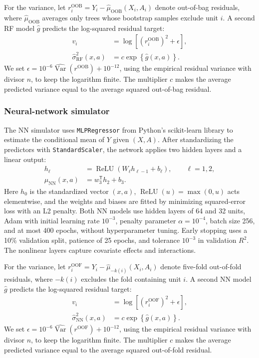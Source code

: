 \begin{landscape}
For the variance, let \(r_i^{\mathrm{OOB}}=Y_i-\widehat\mu_{\mathrm{OOB}}(X_i,A_i)\) denote out-of-bag residuals, where \(\widehat\mu_{\mathrm{OOB}}\) averages only trees whose bootstrap samples exclude unit \(i\). A second RF model \(\widehat g\) predicts the log-squared residual target:
\[
\begin{aligned}
v_i &= \log\!\left[(r_i^{\mathrm{OOB}})^2+\epsilon\right],\\
\widehat\sigma_{\mathrm{RF}}^2(x,a) &= c\exp\!\left\{\widehat g(x,a)\right\}.
\end{aligned}
\]
We set \(\epsilon=10^{-6}\widehat{\operatorname{Var}}(r^{\mathrm{OOB}})+10^{-12}\), using the empirical residual variance with divisor \(n\), to keep the logarithm finite. The multiplier \(c\) makes the average predicted variance equal to the average squared out-of-bag residual.

\subsubsection{Neural-network simulator}

The NN simulator uses \texttt{MLPRegressor} from Python's scikit-learn library to estimate the conditional mean of \(Y\) given \((X,A)\). After standardizing the predictors with \texttt{StandardScaler}, the network applies two hidden layers and a linear output:
\[
\begin{aligned}
h_\ell &= \operatorname{ReLU}(W_\ell h_{\ell-1}+b_\ell),\qquad \ell=1,2,\\
\widehat\mu_{\mathrm{NN}}(x,a) &= w_3^{\mathsf T}h_2+b_3.
\end{aligned}
\]
Here \(h_0\) is the standardized vector \((x,a)\), \(\operatorname{ReLU}(u)=\max(0,u)\) acts elementwise, and the weights and biases are fitted by minimizing squared-error loss with an L2 penalty. Both NN models use hidden layers of 64 and 32 units, Adam with initial learning rate \(10^{-3}\), penalty parameter \(\alpha=10^{-4}\), batch size 256, and at most 400 epochs, without hyperparameter tuning. Early stopping uses a 10\% validation split, patience of 25 epochs, and tolerance \(10^{-3}\) in validation \(R^2\). The nonlinear layers capture covariate effects and interactions.

For the variance, let \(r_i^{\mathrm{OOF}}=Y_i-\widehat\mu_{-k(i)}(X_i,A_i)\) denote five-fold out-of-fold residuals, where \(-k(i)\) excludes the fold containing unit \(i\). A second NN model \(\widehat g\) predicts the log-squared residual target:
\[
\begin{aligned}
v_i &= \log\!\left[(r_i^{\mathrm{OOF}})^2+\epsilon\right],\\
\widehat\sigma_{\mathrm{NN}}^2(x,a) &= c\exp\!\left\{\widehat g(x,a)\right\}.
\end{aligned}
\]
We set \(\epsilon=10^{-6}\widehat{\operatorname{Var}}(r^{\mathrm{OOF}})+10^{-12}\), using the empirical residual variance with divisor \(n\), to keep the logarithm finite. The multiplier \(c\) makes the average predicted variance equal to the average squared out-of-fold residual.


\end{landscape}
